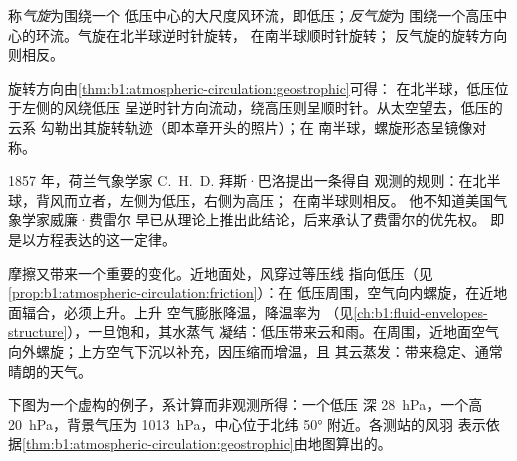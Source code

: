 \begin{definition}[气旋、反气旋]\label{def:b1:atmospheric-circulation:cyclone}
称\emph{气旋}为围绕一个
低压中心的大尺度风环流，即低压；\emph{反气旋}为
围绕一个高压中心的环流。气旋在北半球逆时针旋转，
在南半球顺时针旋转；
反气旋的旋转方向则相反。
\end{definition}

旋转方向由\cref{thm:b1:atmospheric-circulation:geostrophic}可得：
在北半球，低压位于左侧的风绕低压
呈逆时针方向流动，绕高压则呈顺时针。从太空望去，低压的云系
勾勒出其旋转轨迹（即本章开头的照片）；在
南半球，螺旋形态呈镜像对称。

\begin{history}[拜斯·巴洛定律，1857 年]
1857 年，荷兰气象学家 C.~H.~D. 拜斯·巴洛提出一条得自
观测的规则：在北半球，背风而立者，左侧为低压，右侧为高压；
在南半球则相反。
他不知道美国气象学家威廉·费雷尔
早已从理论上推出此结论，后来承认了费雷尔的优先权。
即是以方程表达的这一定律。
\end{history}

摩擦又带来一个重要的变化。近地面处，风穿过等压线
指向低压（见\cref{prop:b1:atmospheric-circulation:friction}）：在
低压周围，空气向内螺旋，在近地面辐合，必须上升。上升
空气膨胀降温，降温率为
（见\cref{ch:b1:fluid-envelopes-structure}），一旦饱和，其水蒸气
凝结：低压带来云和雨。在周围，近地面空气
向外螺旋；上方空气下沉以补充，因压缩而增温，且
其云蒸发：带来稳定、通常晴朗的天气。

下图为一个虚构的例子，系计算而非观测所得：一个低压
深 \qty{28}{hPa}，一个高 \qty{20}{hPa}，背景气压为
\qty{1013}{hPa}，中心位于北纬 \ang{50} 附近。各测站的风羽
表示依据\cref{thm:b1:atmospheric-circulation:geostrophic}由地图算出的。

